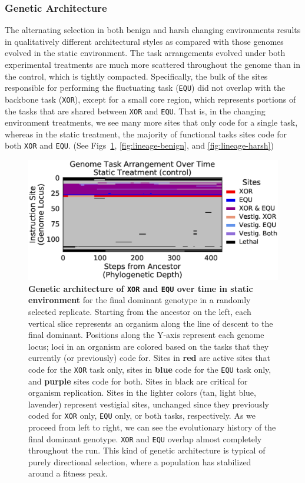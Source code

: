 \documentclass[10pt,letterpaper,final]{article}
\begin{document}
\subsubsection*{Genetic Architecture}
The alternating selection in both benign and harsh changing environments results in qualitatively different architectural styles as compared with those genomes evolved in the static environment. The task arrangements evolved under both experimental treatments are much more scattered throughout the genome than in the control, which is tightly compacted. Specifically, the bulk of the sites responsible for performing the fluctuating task (\texttt{EQU}) did not overlap with the backbone task (\texttt{XOR}), except for a small core region, which represents portions of the tasks that are shared between \texttt{XOR} and \texttt{EQU}. That is, in the changing environment treatments, we see many more sites that only code for a single task, whereas in the static treatment, the majority of functional tasks sites code for both \texttt{XOR} and \texttt{EQU}. (See Figs~\ref{fig:lineage-control}, \ref{fig:lineage-benign}, and \ref{fig:lineage-harsh})

	\begin{figure}[!h]
	\includegraphics[width=0.95\columnwidth]{figures/CE/fig6.eps}
	\caption{\textbf{Genetic architecture of \texttt{XOR} and \texttt{EQU} over time in static environment} for the final dominant genotype in a randomly selected replicate. Starting from the ancestor on the left, each vertical slice represents an organism along the line of descent to the final dominant.
	Positions along the Y-axis represent each genome locus; loci in an organism are colored based on the tasks that they currently (or previously) code for. Sites in \textbf{red} are active sites that code for the \texttt{XOR} task only, sites in \textbf{blue} code for the \texttt{EQU} task only, and \textbf{purple} sites code for both. Sites in black are critical for organism replication. Sites in the lighter colors (tan, light blue, lavender) represent vestigial sites, unchanged since they previously coded for \texttt{XOR} only, \texttt{EQU} only, or both tasks, respectively. As we proceed from left to right, we can see the evolutionary history of the final dominant genotype. \texttt{XOR} and \texttt{EQU} overlap almost completely throughout the run. This kind of genetic architecture is typical of purely directional selection, where a population has stabilized around a fitness peak.}
	\label{fig:lineage-control}
	\end{figure}
\end{document}
